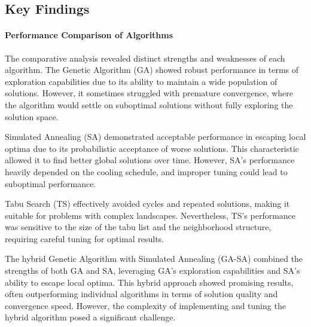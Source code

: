 \documentclass{article}
\begin{document}
    \subsection{Key Findings}

    \paragraph{Performance Comparison of Algorithms}
    The comparative analysis revealed distinct strengths and weaknesses of each algorithm. The Genetic Algorithm (GA) showed robust performance in terms of exploration capabilities due to its ability to maintain a wide population of solutions. However, it sometimes struggled with premature convergence, where the algorithm would settle on suboptimal solutions without fully exploring the solution space.

    Simulated Annealing (SA) demonstrated acceptable performance in escaping local optima due to its probabilistic acceptance of worse solutions. This characteristic allowed it to find better global solutions over time. However, SA's performance heavily depended on the cooling schedule, and improper tuning could lead to suboptimal performance.

    Tabu Search (TS) effectively avoided cycles and repeated solutions, making it suitable for problems with complex landscapes. Nevertheless, TS's performance was sensitive to the size of the tabu list and the neighborhood structure, requiring careful tuning for optimal results.

    The hybrid Genetic Algorithm with Simulated Annealing (GA-SA) combined the strengths of both GA and SA, leveraging GA's exploration capabilities and SA's ability to escape local optima. This hybrid approach showed promising results, often outperforming individual algorithms in terms of solution quality and convergence speed. However, the complexity of implementing and tuning the hybrid algorithm posed a significant challenge.
\end{document}
